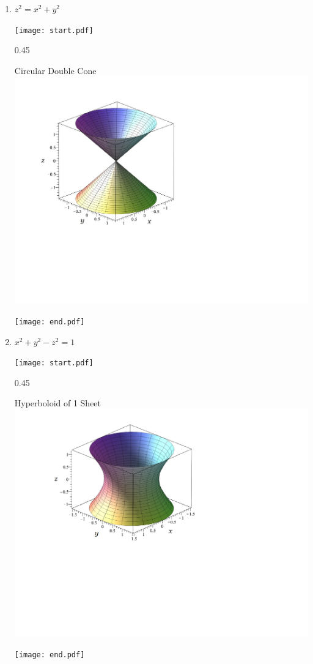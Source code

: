 \documentclass[12pt]{article}
\begin{document}
\begin{enumerate}
\item $z^2=x^2+y^2$

\texttt{[image: start.pdf]}
{{{0.45\linewidth}{\begin{center}Circular Double Cone\\\includegraphics[scale=0.4]{cone1.pdf}\end{center}}}}
\texttt{[image: end.pdf]}


\item $x^2+y^2-z^2=1$

\texttt{[image: start.pdf]}
{{{0.45\linewidth}{\begin{center}Hyperboloid of 1 Sheet\\\includegraphics[scale=0.4]{hyperboloid.pdf}\end{center}}}}
\texttt{[image: end.pdf]}



\end{enumerate}
\end{document}
